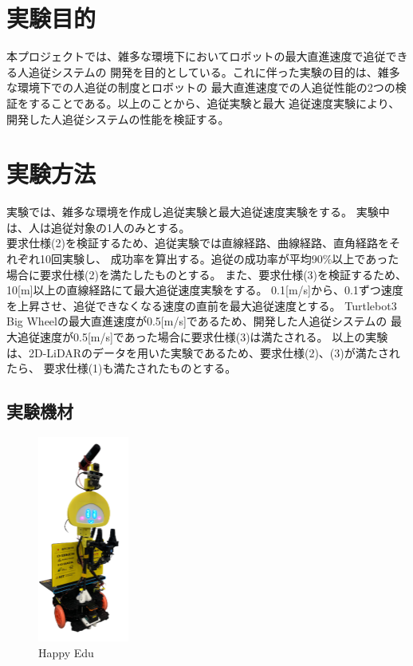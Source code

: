 \section{実験目的}
本プロジェクトでは、雑多な環境下においてロボットの最大直進速度で追従できる人追従システムの
開発を目的としている。これに伴った実験の目的は、雑多な環境下での人追従の制度とロボットの
最大直進速度での人追従性能の2つの検証をすることである。以上のことから、追従実験と最大
追従速度実験により、開発した人追従システムの性能を検証する。

\section{実験方法}
実験では、雑多な環境を作成し追従実験と最大追従速度実験をする。
実験中は、人は追従対象の1人のみとする。\\ \indent
要求仕様(2)を検証するため、追従実験では直線経路、曲線経路、直角経路をそれぞれ10回実験し、
成功率を算出する。追従の成功率が平均90\%以上であった場合に要求仕様(2)を満たしたものとする。
また、要求仕様(3)を検証するため、10[m]以上の直線経路にて最大追従速度実験をする。
0.1[m/s]から、0.1ずつ速度を上昇させ、追従できなくなる速度の直前を最大追従速度とする。
Turtlebot3 Big Wheelの最大直進速度が0.5[m/s]であるため、開発した人追従システムの
最大追従速度が0.5[m/s]であった場合に要求仕様(3)は満たされる。
以上の実験は、2D-LiDARのデータを用いた実験であるため、要求仕様(2)、(3)が満たされたら、
要求仕様(1)も満たされたものとする。

\subsection{実験機材}
\begin{figure}[h]
  \begin{center}
  \includegraphics[width=30mm,clip]{figure/Happy_Edu.png}
  \caption{Happy Edu}
  \label{Happy Edu}
  \end{center}
\end{figure}

